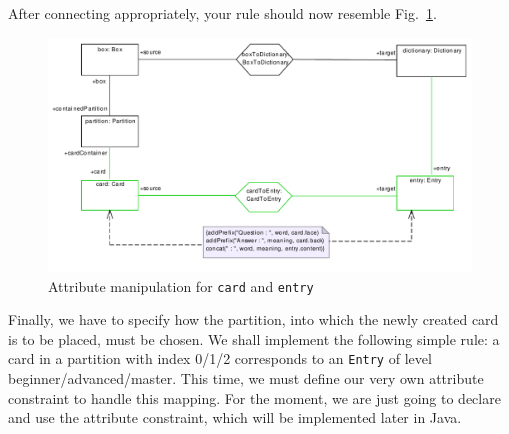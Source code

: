 After connecting appropriately, your rule should now resemble Fig.~\ref{fig:cardtoentry_2}.

\begin{figure}[htbp]
\begin{center}
  \includegraphics[width=\textwidth]{pics/tggBilder/tggRule/tgg20}
  \caption{Attribute manipulation for \texttt{card} and \texttt{entry}}
  \label{fig:cardtoentry_2}
\end{center}
\end{figure}
\FloatBarrier

Finally, we have to specify how the partition, into which the newly created card is to be placed, must be chosen.
We shall implement the following simple rule: a card in a partition with index 0/1/2 corresponds to an \texttt{Entry} of level beginner/advanced/master.
This time, we must define our very own attribute constraint to handle this mapping.
For the moment, we are just going to declare and use the attribute constraint, which will be implemented later in Java.


